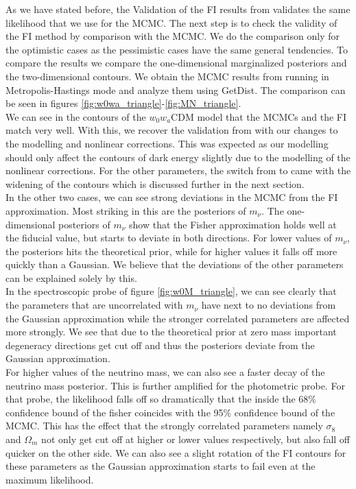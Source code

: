 \documentclass[../main.tex]{subfiles}
\begin{document}
As we have stated before, the Validation of the FI results from \montefisher validates the same likelihood that we use for the MCMC. The next step is to check the validity of the FI method by comparison with the MCMC. We do the comparison only for the optimistic cases as the pessimistic cases have the same general tendencies. To compare the results we compare the one-dimensional marginalized posteriors and the two-dimensional contours. We obtain the MCMC results from \montepython running in Metropolis-Hastings mode and analyze them using GetDist. The comparison can be seen in figures \ref{fig:w0wa_triangle}-\ref{fig:MN_triangle}.\\
We can see in the contours of the $w_0w_a$CDM model that the MCMCs and the FI match very well. With this, we recover the validation from \cite{casas2023euclid} with our changes to the modelling and nonlinear corrections. This was expected as our modelling should only affect the contours of dark energy slightly due to the modelling of the nonlinear corrections. For the other parameters, the switch from \halofit to \hmcode came with the widening of the contours which is discussed further in the next section.\\
In the other two cases, we can see strong deviations in the MCMC from the FI approximation. Most striking in this are the posteriors of $m_\nu$.  The one-dimensional posteriors of $m_\nu$ show that the Fisher approximation holds well at the fiducial value, but starts to deviate in both directions. For lower values of $m_\nu$, the posteriors hits the theoretical prior, while for higher values it falls off more quickly than a Gaussian. We believe that the deviations of the other parameters can be explained solely by this.\\
In the spectroscopic probe of figure \ref{fig:w0M_triangle}, we can see clearly that the parameters that are uncorrelated with $m_\nu$ have next to no deviations from the Gaussian approximation while the stronger correlated parameters are affected more strongly. We see that due to the theoretical prior at zero mass important degeneracy directions get cut off and thus the posteriors deviate from the Gaussian approximation.\\
For higher values of the neutrino mass, we can also see a faster decay of the neutrino mass posterior. This is further amplified for the photometric probe. For that probe, the likelihood falls off so dramatically that the inside the 68\% confidence bound of the fisher coincides with the 95\% confidence bound of the MCMC. This has the effect that the strongly correlated parameters namely $\sigma_8$ and $\Omega_m$ not only get cut off at higher or lower values respectively, but also fall off quicker on the other side. We can also see a slight rotation of the FI contours for these parameters as the Gaussian approximation starts to fail even at the maximum likelihood.\\
\end{document}
